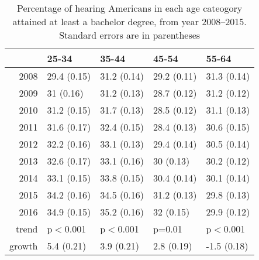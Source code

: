 \documentclass{article}\usepackage[]{graphicx}\usepackage[]{color}
\begin{document}
\begin{table}[ht]
\centering
\begin{tabular}{rllll}
  \hline
 & 25-34 & 35-44 & 45-54 & 55-64 \\
  \hline
2008 & 29.4 (0.15) & 31.2 (0.14) & 29.2 (0.11) & 31.3 (0.14) \\
  2009 & 31 (0.16) & 31.2 (0.13) & 28.7 (0.12) & 31.2 (0.12) \\
  2010 & 31.2 (0.15) & 31.7 (0.13) & 28.5 (0.12) & 31.1 (0.13) \\
  2011 & 31.6 (0.17) & 32.4 (0.15) & 28.4 (0.13) & 30.6 (0.15) \\
  2012 & 32.2 (0.16) & 33.1 (0.13) & 29.4 (0.14) & 30.5 (0.14) \\
  2013 & 32.6 (0.17) & 33.1 (0.16) & 30 (0.13) & 30.2 (0.12) \\
  2014 & 33.1 (0.15) & 33.8 (0.15) & 30.4 (0.14) & 30.1 (0.14) \\
  2015 & 34.2 (0.16) & 34.5 (0.16) & 31.2 (0.13) & 29.8 (0.13) \\
  2016 & 34.9 (0.15) & 35.2 (0.16) & 32 (0.15) & 29.9 (0.12) \\
  trend & p$<$0.001 & p$<$0.001 & p=0.01 & p$<$0.001 \\
  growth & 5.4 (0.21) & 3.9 (0.21) & 2.8 (0.19) & -1.5 (0.18) \\
   \hline
\end{tabular}
\caption{Percentage of hearing Americans in each age cateogory attained at least a bachelor degree, from year 2008--2015. Standard errors are in parentheses}
\label{tab:hearAgeTime}
\end{table}
\end{document}
